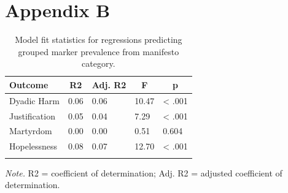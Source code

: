 \documentclass[
  english,
  man,floatsintext]{apa6}
\begin{document}
\newpage

\clearpage

\section{Appendix B}\label{appendix-b}

\begin{table}[H]

\begin{center}
\begin{threeparttable}

\caption{\label{tab:manifesto-model-fit}Model fit statistics for regressions predicting grouped marker prevalence from manifesto category.}

\begin{tabular}{lllll}
\toprule
Outcome & \multicolumn{1}{c}{R2} & \multicolumn{1}{c}{Adj. R2} & \multicolumn{1}{c}{F} & \multicolumn{1}{c}{p}\\
\midrule
Dyadic Harm & 0.06 & 0.06 & 10.47 & < .001\\
Justification & 0.05 & 0.04 & 7.29 & < .001\\
Martyrdom & 0.00 & 0.00 & 0.51 & 0.604\\
Hopelessness & 0.08 & 0.07 & 12.70 & < .001\\
\bottomrule
\addlinespace
\end{tabular}

\begin{tablenotes}[para]
\normalsize{\textit{Note.} R2 = coefficient of determination; Adj. R2 = adjusted coefficient of determination.}
\end{tablenotes}

\end{threeparttable}
\end{center}

\end{table}
\end{document}
